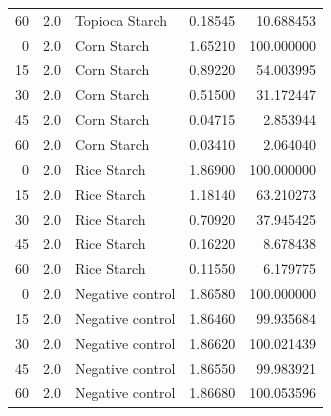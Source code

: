 \documentclass[
  12pt,
]{article}
\begin{document}
{\begin{longtable}[]{@{}rrlrr@{}}
60 & 2.0 & Topioca Starch & 0.18545 & 10.688453 \\
0 & 2.0 & Corn Starch & 1.65210 & 100.000000 \\
15 & 2.0 & Corn Starch & 0.89220 & 54.003995 \\
30 & 2.0 & Corn Starch & 0.51500 & 31.172447 \\
45 & 2.0 & Corn Starch & 0.04715 & 2.853944 \\
60 & 2.0 & Corn Starch & 0.03410 & 2.064040 \\
0 & 2.0 & Rice Starch & 1.86900 & 100.000000 \\
15 & 2.0 & Rice Starch & 1.18140 & 63.210273 \\
30 & 2.0 & Rice Starch & 0.70920 & 37.945425 \\
45 & 2.0 & Rice Starch & 0.16220 & 8.678438 \\
60 & 2.0 & Rice Starch & 0.11550 & 6.179775 \\
0 & 2.0 & Negative control & 1.86580 & 100.000000 \\
15 & 2.0 & Negative control & 1.86460 & 99.935684 \\
30 & 2.0 & Negative control & 1.86620 & 100.021439 \\
45 & 2.0 & Negative control & 1.86550 & 99.983921 \\
60 & 2.0 & Negative control & 1.86680 & 100.053596 \\
\end{longtable}
}
\end{document}
